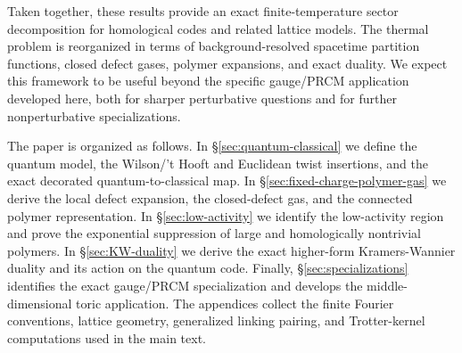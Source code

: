 Taken together, these results provide an exact finite-temperature sector
decomposition for homological codes and related lattice models. The thermal
problem is reorganized in terms of background-resolved spacetime partition functions,
closed defect gases, polymer expansions, and exact duality. We expect this
framework to be useful beyond the specific gauge/PRCM application developed
here, both for sharper perturbative questions and for further nonperturbative
specializations.

The paper is organized as follows. In \S\ref{sec:quantum-classical} we define
the quantum model, the Wilson/'t Hooft and Euclidean twist insertions, and the
exact decorated quantum-to-classical map. In
\S\ref{sec:fixed-charge-polymer-gas} we derive the local defect expansion, the
closed-defect gas, and the connected polymer representation. In
\S\ref{sec:low-activity} we identify the low-activity region and prove the
exponential suppression of large and homologically nontrivial polymers. In
\S\ref{sec:KW-duality} we derive the exact higher-form Kramers-Wannier duality
and its action on the quantum code. Finally, \S\ref{sec:specializations}
identifies the exact gauge/PRCM specialization and develops the
middle-dimensional toric application. The appendices collect the finite Fourier
conventions, lattice geometry, generalized linking pairing, and Trotter-kernel
computations used in the main text.






